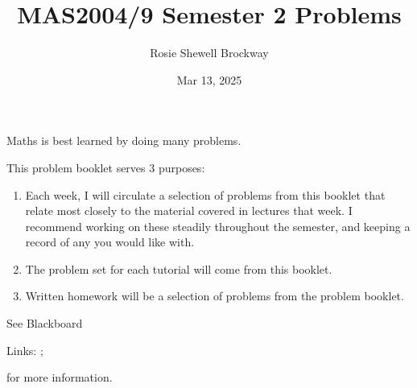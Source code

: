 \documentclass[letterpaper,10pt,english]{jupyterBook}
\title{MAS2004/9 Semester 2 Problems}
\date{Mar 13, 2025}
\author{Rosie Shewell Brockway}
\begin{document}
\pagestyle{empty}
\sphinxmaketitle
\pagestyle{plain}
\sphinxtableofcontents
\pagestyle{normal}
\label{\detokenize{intro::doc}}


\sphinxAtStartPar
Maths is best learned by doing many problems.

\sphinxAtStartPar
This problem booklet serves 3 purposes:

\label{\detokenize{intro:pow}}\begin{enumerate}
%
\item {} 
\sphinxAtStartPar
{} 
Each week, I will circulate a selection of problems from this booklet that relate most closely to the material covered in lectures that week. I recommend working on these steadily throughout the semester, and keeping a record of any you would like  with.

\item {} 
\sphinxAtStartPar
{} 
The problem set for each tutorial will come from this booklet.

\item {} 
\sphinxAtStartPar
{} 
Written homework will be a selection of problems from the problem booklet. 

\end{enumerate}

\sphinxAtStartPar
See Blackboard%
\begin{footnote}[1]\sphinxAtStartFootnote
Links: ; 
%
\end{footnote} for more information.



\begin{DUlineblock}{0em}
\item[] 
\end{DUlineblock}

\sphinxAtStartPar
{\hyperref[\detokenize{Problems:prob}]{}} 
  {\hyperref[\detokenize{Problems:ch1prob}]{}} 
  {\hyperref[\detokenize{Problems:ch2prob}]{}} 
  {\hyperref[\detokenize{Problems:ch3prob}]{}} 
  {\hyperref[\detokenize{Problems:ch4prob}]{}} 
  {\hyperref[\detokenize{Problems:ch5prob}]{}} 
  {\hyperref[\detokenize{Problems:ch6prob}]{}}
\end{document}
